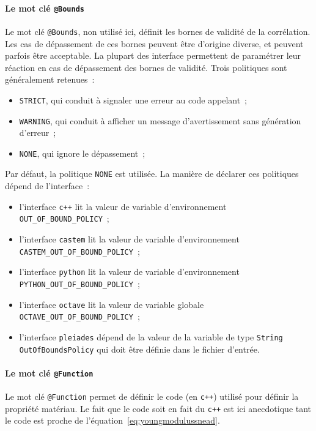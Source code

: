\documentclass[12pt]{article}
\begin{document}
\paragraph{Le mot clé \texttt{@Bounds}} Le mot clé \texttt{@Bounds},
non utilisé ici, définit les bornes de validité de la corrélation. Les
cas de dépassement de ces bornes peuvent être d'origine diverse, et
peuvent parfois être acceptable.  La plupart des interface permettent
de paramétrer leur réaction en cas de dépassement des bornes de
validité. Trois politiques sont généralement retenues~:
\begin{itemize}
\item \texttt{STRICT}, qui conduit à signaler une erreur au code
appelant~;
\item \texttt{WARNING}, qui conduit à afficher un message
d'avertissement sans génération d'erreur~;
\item \texttt{NONE}, qui ignore le dépassement~;
\end{itemize} Par défaut, la politique \texttt{NONE} est utilisée. La
manière de déclarer ces politiques dépend de l'interface~:
\begin{itemize}
\item l'interface {\texttt{c++}} lit la valeur de variable
d'environnement \texttt{OUT\_\-OF\_\-BOUND\_\-POLICY}~;
\item l'interface {\texttt{castem}} lit la valeur de variable
d'environnement \texttt{CASTEM\_\-OUT\_\-OF\_\-BOUND\_\-POLICY}~;
\item l'interface {\texttt{python}} lit la valeur de variable
d'environnement \texttt{PYTHON\_\-OUT\_\-OF\_\-BOUND\_\-POLICY}~;
\item l'interface {\texttt{octave}} lit la valeur de variable globale
\texttt{OCTAVE\_\-OUT\_\-OF\_\-BOUND\_\-POLICY}~;
\item l'interface {\texttt{pleiades}} dépend de la valeur de la
variable de type \texttt{String} \texttt{OutOfBoundsPolicy} qui doit
être définie dans le fichier d'entrée.
\end{itemize}

\paragraph{Le mot clé \texttt{@Function}} Le mot clé
\texttt{@Function} permet de définir le code (en \texttt{c++}) utilisé
pour définir la propriété matériau. Le fait que le code soit en fait
du \texttt{c++} est ici anecdotique tant le code est proche de
l'équation~\eqref{eq:youngmodulussnead}.
\end{document}
